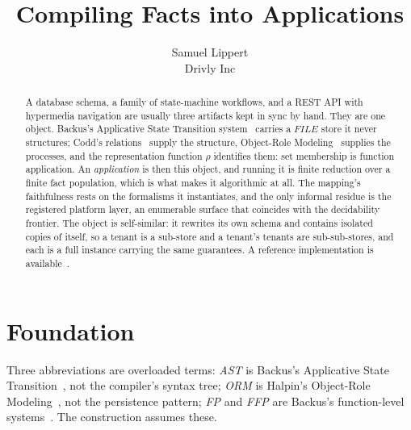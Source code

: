 \documentclass[10pt,twocolumn]{article}
\title{\textbf{Compiling Facts into Applications}}
\author{Samuel Lippert\\Drivly Inc}
\date{}
\theoremstyle{plain}
\theoremstyle{definition}
\begin{document}
\maketitle

\begin{abstract}
A database schema, a family of state-machine workflows, and a REST API with hypermedia navigation are usually three artifacts kept in sync by hand. They are one object. Backus's Applicative State Transition system~\cite{backus78} carries a $\mathit{FILE}$ store it never structures; Codd's relations~\cite{codd70} supply the structure, Object-Role Modeling~\cite{halpin08} supplies the processes, and the representation function $\rho$ identifies them: set membership is function application. An \emph{application} is then this object, and running it is finite reduction over a finite fact population, which is what makes it algorithmic at all. The mapping's faithfulness rests on the formalisms it instantiates, and the only informal residue is the registered platform layer, an enumerable surface that coincides with the decidability frontier. The object is self-similar: it rewrites its own schema and contains isolated copies of itself, so a tenant is a sub-store and a tenant's tenants are sub-sub-stores, and each is a full instance carrying the same guarantees. A reference implementation is available~\cite{arest}.
\end{abstract}


\section{Foundation}\label{sec:foundation}

Three abbreviations are overloaded terms: \emph{AST} is Backus's Applicative State Transition~\cite[Sec.\,14]{backus78}, not the compiler's syntax tree; \emph{ORM} is Halpin's Object-Role Modeling~\cite{halpin08}, not the persistence pattern; \emph{FP} and \emph{FFP} are Backus's function-level systems~\cite[Secs.\,11,\,13]{backus78}. The construction assumes these.
\end{document}
